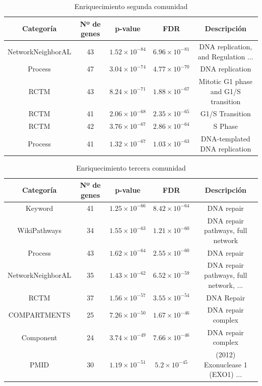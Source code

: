 \begin{table}[h]
	\centering
	\caption{Enriquecimiento segunda comunidad}
	\label{tabla:enrique2}
	\begin{tabular}{|c|c|c|c|c|}
		\hline
		\textbf{Categoría} & \textbf{Nº de genes} & \textbf{p-value} & \textbf{FDR} & \textbf{Descripción} \\
		\hline
		NetworkNeighborAL & 43 & $1.52 \times 10^{-84}$ & $6.96 \times 10^{-81}$ & DNA replication, and Regulation ... \\
		Process & 47 & $3.04 \times 10^{-74}$ & $4.77 \times 10^{-70}$ & DNA replication \\
		RCTM & 43 & $8.24 \times 10^{-71}$ & $1.88 \times 10^{-67}$ & Mitotic G1 phase and G1/S transition \\
		RCTM & 41 & $2.06 \times 10^{-68}$ & $2.35 \times 10^{-65}$ & G1/S Transition \\
		RCTM & 42 & $3.76 \times 10^{-67}$ & $2.86 \times 10^{-64}$ & S Phase \\
		Process & 41 & $1.32 \times 10^{-67}$ & $1.03 \times 10^{-63}$ & DNA-templated DNA replication \\
		\hline
	\end{tabular}
\end{table}

\begin{table}[h]
	\centering
	\caption{Enriquecimiento tercera comunidad}
	\label{tabla:enrique4}
	\begin{tabular}{|c|c|c|c|c|}
		\hline
		\textbf{Categoría} & \textbf{Nº de genes} & \textbf{p-value} & \textbf{FDR} & \textbf{Descripción} \\
		\hline
		Keyword & 41 & $1.25 \times 10^{-66}$ & $8.42 \times 10^{-64}$ & DNA repair \\
		WikiPathways & 34 & $1.55 \times 10^{-63}$ & $1.21 \times 10^{-60}$ & DNA repair pathways, full network \\
		Process & 43 & $1.62 \times 10^{-64}$ & $2.55 \times 10^{-60}$ & DNA repair \\
		NetworkNeighborAL & 35 & $1.43 \times 10^{-62}$ & $6.52 \times 10^{-59}$ & DNA repair pathways, full network, ... \\
		RCTM & 37 & $1.56 \times 10^{-57}$ & $3.55 \times 10^{-54}$ & DNA Repair \\
		COMPARTMENTS & 25 & $7.26 \times 10^{-50}$ & $1.67 \times 10^{-46}$ & DNA repair complex \\
		Component & 24 & $3.74 \times 10^{-49}$ & $7.66 \times 10^{-46}$ & DNA repair complex \\
		PMID & 30 & $1.19 \times 10^{-51}$ & $5.2 \times 10^{-45}$ & (2012) Exonuclease 1 (EXO1) ...\\
		\hline
	\end{tabular}
\end{table}


\clearpage